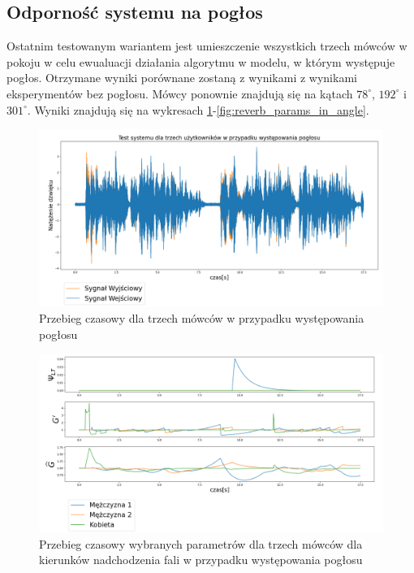 \subsection{Odporność systemu na pogłos}

Ostatnim testowanym wariantem jest umieszczenie wszystkich trzech mówców w pokoju w celu ewualuacji działania algorytmu w modelu, w którym występuje pogłos. Otrzymane wyniki porównane zostaną z wynikami z wynikami eksperymentów bez pogłosu. Mówcy ponownie znajdują się na kątach $78^{\circ}$, $192^{\circ}$ i $301^{\circ}$. Wyniki znajdują się na wykresach \ref{fig:reverb}-\ref{fig:reverb_params_in_angle}.

\begin{figure}[h!]
    \centering
    \includegraphics[width=\textwidth]{Images/reverb.png}
    \caption{Przebieg czasowy dla trzech mówców w przypadku występowania pogłosu}
    \label{fig:reverb}
\end{figure}

\begin{figure}[h!]
    \centering
    \includegraphics[width=\textwidth]{Images/reverb_params_in_time.png}
    \caption{Przebieg czasowy wybranych parametrów dla trzech mówców dla kierunków nadchodzenia fali w przypadku występowania pogłosu}
    \label{fig:reverb_params_in_time}
\end{figure}

